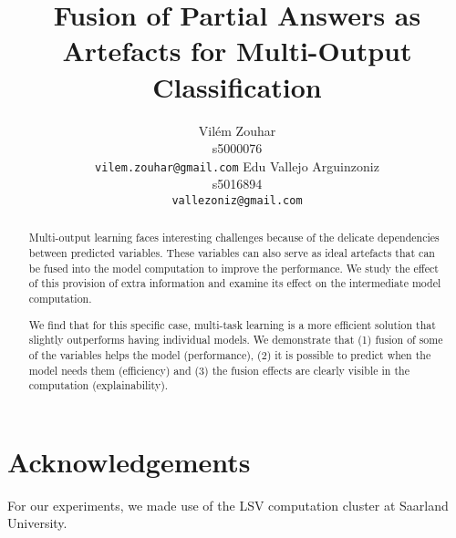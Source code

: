 \documentclass[11pt]{article}
\title{Fusion of Partial Answers as Artefacts for Multi-Output Classification}
\author{
    Vilém Zouhar \\ s5000076 \\
    \texttt{vilem.zouhar@gmail.com}
    \And
    Edu Vallejo Arguinzoniz \\ s5016894 \\
    \texttt{vallezoniz@gmail.com}
}
\date{}
\begin{document}
\maketitle
\begin{abstract}
    Multi-output learning faces interesting challenges because of the delicate dependencies between predicted variables.
    These variables can also serve as ideal artefacts that can be fused into the model computation to improve the performance.
    We study the effect of this provision of extra information and examine its effect on the intermediate model computation.
    
    We find that for this specific case, multi-task learning is a more efficient solution that slightly outperforms having individual models.
    We demonstrate that
    (1) fusion of some of the variables helps the model (performance),
    (2) it is possible to predict when the model needs them (efficiency) and
    (3) the fusion effects are clearly visible in the computation (explainability).
\end{abstract}



\section*{Acknowledgements}

For our experiments, we made use of the LSV computation cluster at Saarland University.




\newpage

\appendix


\end{document}
